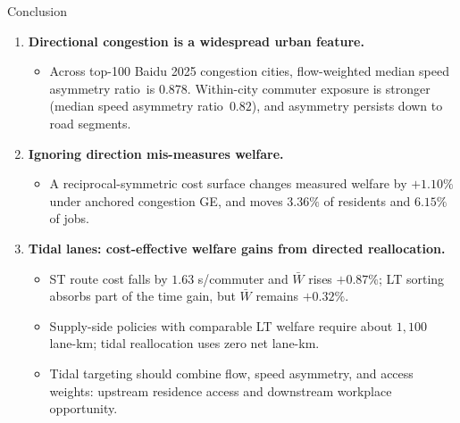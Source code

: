 \documentclass[11pt,aspectratio=169]{beamer}
\newcommand{\good}[1]{\textcolor{blue!70!black}{#1}}
\newcommand{\bad}[1]{\textcolor{red!70!black}{#1}}
\newcommand{\SAR}{speed asymmetry ratio}
\begin{document}
\begin{frame}{Conclusion}
\begin{enumerate}
  \item \textbf{Directional congestion is a widespread urban feature.}
  \begin{itemize}\footnotesize
    \item Across top-100 Baidu 2025 congestion cities, flow-weighted median \SAR\ is \good{0.878}. Within-city commuter exposure is stronger (median \SAR\ $0.82$), and asymmetry persists down to road segments.
  \end{itemize}
  \item \textbf{Ignoring direction mis-measures welfare.}
  \begin{itemize}\footnotesize
    \item A reciprocal-symmetric cost surface changes measured welfare by \good{$+1.10\%$} under anchored congestion GE, and moves \good{$3.36\%$} of residents and \good{$6.15\%$} of jobs.
  \end{itemize}
  \item \textbf{Tidal lanes: cost-effective welfare gains from directed reallocation.}
  \begin{itemize}\footnotesize
    \item ST route cost falls by \good{$1.63$ s/commuter} and $\bar W$ rises \good{$+0.87\%$}; LT sorting absorbs part of the time gain, but $\bar W$ remains \good{$+0.32\%$}.
    \item Supply-side policies with comparable LT welfare require about \bad{$1{,}100$ lane-km}; tidal reallocation uses \good{zero net lane-km}.
    \item Tidal targeting should combine flow, speed asymmetry, and access weights: upstream residence access and downstream workplace opportunity.
  \end{itemize}
\end{enumerate}
\end{frame}

\end{document}
